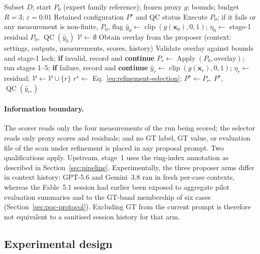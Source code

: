 \documentclass[a4paper,fleqn]{cas-dc}
\begin{document}
\begin{algorithm}[!htb]
\caption{Proxy-guided parameter refinement}
\label{alg:reflective_adaptation}
\small
\begin{algorithmic}[1]
\Require Subset $D$; start $P_0$ (expert family reference); frozen proxy $g$; bounds; budget $R=3$; $\varepsilon=0.01$
\Ensure Retained configuration $P^\star$ and QC status
\State Execute $P_0$; if it fails or any measurement is non-finite, \Return $P_0$, flag
\State $\hat y_0\gets\operatorname{clip}(g(\mathbf x_0),0,1)$; $\eta_0\gets$ stage-1 residual
 \Return $P_0$, $\operatorname{QC}(\hat y_0)$ 
\EndIf
\State $\mathcal V\gets\emptyset$
  \State Obtain overlay from the proposer (context: settings, outputs, measurements, scores, history)
  \State Validate overlay against bounds and stage-1 lock; \textbf{if} invalid, record and \textbf{continue}
  \State $P_r\gets\operatorname{Apply}(P_0,\text{overlay})$; run stages 1--5; \textbf{if} failure, record and \textbf{continue}
  \State $\hat y_r\gets\operatorname{clip}(g(\mathbf x_r),0,1)$; $\eta_r\gets$ residual; $\mathcal V\gets\mathcal V\cup\{r\}$
\EndFor
\State $r^\star\gets$ Eq.~\eqref{eq:refinement-selection}; $P^\star\gets P_{r^\star}$
\State \Return $P^\star$, $\operatorname{QC}(\hat y_{r^\star})$
\end{algorithmic}
\end{algorithm}

\paragraph{Information boundary.}
The scorer reads only the four measurements of the run being scored; the selector reads only proxy scores and residuals; and no GT label, GT value, or evaluation file of the scan under refinement is placed in any proposal prompt. Two qualifications apply. Upstream, stage~1 uses the ring-index annotation as described in Section~\ref{sec:pipeline}. Experimentally, the three proposer arms differ in context history: GPT-5.6 and Gemini~3.8 ran in fresh per-case contexts, whereas the Fable~5.1 session had earlier been exposed to aggregate pilot evaluation summaries and to the GT-band membership of six cases (Section~\ref{sec:poc-protocol}). Excluding GT from the current prompt is therefore not equivalent to a sanitised session history for that arm.

\subsection{Experimental design}
\label{sec:exp-setup}
\end{document}
